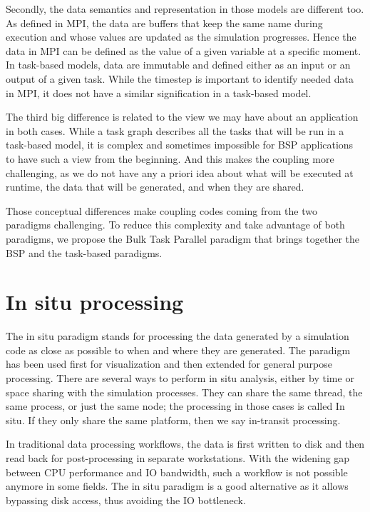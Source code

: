 Secondly, the data semantics and representation in those models are different too. As defined in MPI, the data are buffers that keep the same name during execution and whose values are updated as the simulation progresses. Hence the data in MPI can be defined as the value of a given variable at a specific moment.
In task-based models, data are immutable and defined either as an input or an output of a given task. While the timestep is important to identify needed data in MPI, it does not have a similar signification in a task-based model. 

The third big difference is related to the view we may have about an application in both cases. While a task graph describes all the tasks that will be run in a task-based model, it is complex and sometimes impossible for BSP applications to have such a view from the beginning. And this makes the coupling more challenging, as we do not have any a priori idea about what will be executed at runtime, the data that will be generated, and when they are shared.

Those conceptual differences make coupling codes coming from the two paradigms challenging. To reduce this complexity and take advantage of both paradigms, we propose the Bulk Task Parallel paradigm that brings together the BSP and the task-based paradigms. 



\section{In situ processing}

The in situ paradigm stands for processing the data generated by a simulation code as close as possible to when and where they are generated. The paradigm has been used first for visualization\cite{} and then extended for general purpose processing. There are several ways to perform in situ analysis, either by time or space sharing with the simulation processes. They can share the same thread, the same process, or just the same node; the processing in those cases is called In situ. If they only share the same platform, then we say in-transit processing.

In traditional data processing workflows, the data is first written to disk and then read back for post-processing in separate workstations. With the widening gap between CPU performance and IO bandwidth, such a workflow is not possible anymore in some fields. The in situ paradigm is a good alternative as it allows bypassing disk access, thus avoiding the IO bottleneck.  

